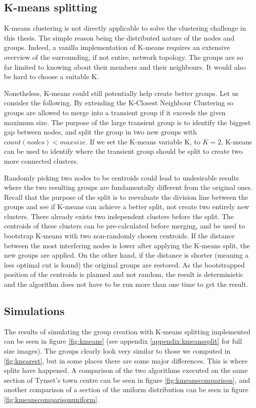 \subsection{K-means splitting}
K-means clustering is not directly applicable to solve the clustering challenge in this thesis. The simple reason being the distributed nature of
the nodes and groups. Indeed, a vanilla implementation of K-means requires an extensive overview of the surrounding, if not entire, network topology.
The groups are so far limited to knowing about their members and their neighbours. It would also be hard to choose a suitable K. 

Nonetheless, K-means could still potentially help create better groups. Let us consider the following.
By extending the K-Closest Neighbour Clustering so groups are allowed to merge into a transient group if it exceeds the given maximum size.
The purpose of the large transient group is to identify the biggest gap between nodes, and split the group in two new groups with
$count(nodes) < maxsize$. If we set the K-means variable K, to $K=2$, K-means can be used to identify where the transient group should be split to create two more connected clusters. 

Randomly picking two nodes to be centroids could lead to undesirable results where the two resulting groups are fundamentally different from the original ones.
Recall that the purpose of the split is to reevaluate the division line between the groups and see if K-means can achieve a better split, not create two entirely new clusters.
There already exists two independent clusters before the split. The centroids of these clusters can be pre-calculated before merging, and be used to bootstrap K-means with two non-randomly chosen
centroids.
If the distance between the most interfering nodes is lower after applying the K-means split, the new groups are applied. On the other hand, if the distance is shorter
(meaning a less optimal cut is found) the original groups are restored. As the bootstrapped position of the centroids is planned and not random,
the result is deterministic and the algorithm does not have to be run more than one time to get the result. 


\subsection{Simulations}
The results of simulating the group creation with K-means splitting implemented can be seen in figure \ref{fig:kmeans} (see 
appendix \ref{appendix:kmeanssplit} for full size images). The groups clearly look very similar to those we computed in \ref{fig:knearest}, but in some places there are some major differences. This is where splits have happened. A comparison of the two algorithms executed on the same section of Tynset's town centre can be seen in figure \ref{fig:kmeanscomparison}, and another
comparison of a section of the uniform distribution can be seen in figure \ref{fig:kmeanscomparisonuniform}. 

